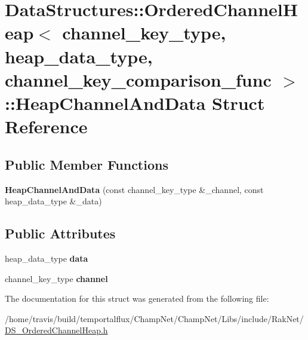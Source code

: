 \hypertarget{struct_data_structures_1_1_ordered_channel_heap_1_1_heap_channel_and_data}{\section{Data\-Structures\-:\-:Ordered\-Channel\-Heap$<$ channel\-\_\-key\-\_\-type, heap\-\_\-data\-\_\-type, channel\-\_\-key\-\_\-comparison\-\_\-func $>$\-:\-:Heap\-Channel\-And\-Data Struct Reference}
\label{struct_data_structures_1_1_ordered_channel_heap_1_1_heap_channel_and_data}
}
\subsection*{Public Member Functions}
\begin{DoxyCompactItemize}
\item 
\hypertarget{struct_data_structures_1_1_ordered_channel_heap_1_1_heap_channel_and_data_ada0ca9b94437a7841736d7f6bec2874d}{{\bfseries Heap\-Channel\-And\-Data} (const channel\-\_\-key\-\_\-type \&\-\_\-channel, const heap\-\_\-data\-\_\-type \&\-\_\-data)}\label{struct_data_structures_1_1_ordered_channel_heap_1_1_heap_channel_and_data_ada0ca9b94437a7841736d7f6bec2874d}

\end{DoxyCompactItemize}
\subsection*{Public Attributes}
\begin{DoxyCompactItemize}
\item 
\hypertarget{struct_data_structures_1_1_ordered_channel_heap_1_1_heap_channel_and_data_a64530eaa3b1a5893d83b87d074b2ea61}{heap\-\_\-data\-\_\-type {\bfseries data}}\label{struct_data_structures_1_1_ordered_channel_heap_1_1_heap_channel_and_data_a64530eaa3b1a5893d83b87d074b2ea61}

\item 
\hypertarget{struct_data_structures_1_1_ordered_channel_heap_1_1_heap_channel_and_data_abe0f345d5b43d1df33b2830ea520a401}{channel\-\_\-key\-\_\-type {\bfseries channel}}\label{struct_data_structures_1_1_ordered_channel_heap_1_1_heap_channel_and_data_abe0f345d5b43d1df33b2830ea520a401}

\end{DoxyCompactItemize}


The documentation for this struct was generated from the following file\-:\begin{DoxyCompactItemize}
\item 
/home/travis/build/temportalflux/\-Champ\-Net/\-Champ\-Net/\-Libs/include/\-Rak\-Net/\hyperlink{_d_s___ordered_channel_heap_8h}{D\-S\-\_\-\-Ordered\-Channel\-Heap.\-h}\end{DoxyCompactItemize}
